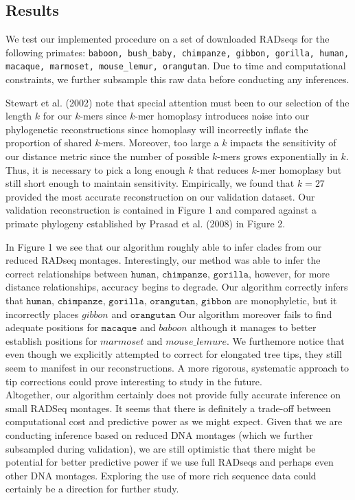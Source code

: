 \documentclass[a4paper]{article}
\begin{document}
\begin{multicols}{2}
\section{Results}
We test our implemented procedure on a set of downloaded RADseqs for the following primates: \texttt{baboon, bush\_baby, chimpanze, gibbon, gorilla, human, macaque, marmoset, mouse\_lemur, orangutan}. Due to time and computational constraints, we further subsample this raw data before conducting any inferences.

Stewart et al. (2002) note that special attention must been to our selection of the length $k$ for our $k$-mers since $k$-mer homoplasy introduces noise into our phylogenetic reconstructions since homoplasy will incorrectly inflate the proportion of shared $k$-mers. Moreover, too large a $k$ impacts the sensitivity of our distance metric since the number of possible $k$-mers grows exponentially in $k$. Thus, it is necessary to pick a long enough $k$ that reduces $k$-mer homoplasy but still short enough to maintain sensitivity. Empirically, we found that $k=27$ provided the most accurate reconstruction on our validation dataset. Our validation reconstruction is contained in Figure 1 and compared against a primate phylogeny established by Prasad et al. (2008) in Figure 2.

In Figure 1 we see that our algorithm roughly able to infer clades from our reduced RADseq montages. Interestingly, our method was able to infer the correct relationships between $\texttt{human, chimpanze, gorilla}$, however, for more distance relationships, accuracy begins to degrade. Our algorithm correctly infers that  $\texttt{human, chimpanze, gorilla, orangutan, gibbon}$ are monophyletic, but it incorrectly places $gibbon$ and $\texttt{orangutan}$ Our algorithm moreover fails to find adequate positions for $\texttt{macaque}$ and $baboon$ although it manages to better establish positions for $marmoset$ and $mouse\_lemure$. We furthemore notice that even though we explicitly attempted to correct for elongated tree tips, they still seem to manifest in our reconstructions. A more rigorous, systematic approach to tip corrections could prove interesting to study in the future.\\

Altogether, our algorithm certainly does not provide fully accurate inference on small RADSeq montages. It seems that there is definitely a trade-off between computational cost and predictive power as we might expect. Given that we are conducting inference based on reduced DNA montages (which we further subsampled during validation), we are still optimistic that there might be potential for better predictive power if we use full RADseqs and perhaps even other DNA montages. Exploring the use of more rich sequence data could certainly be a direction for further study.


\end{multicols}
\end{document}
